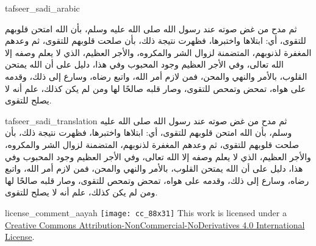 \begin{taggedblock}{tafseer_sadi_arabic}
\begin{Arabic}
ثم مدح من غض صوته عند رسول الله صلى الله عليه وسلم، بأن الله امتحن قلوبهم للتقوى، أي: ابتلاها واختبرها، فظهرت نتيجة ذلك، بأن صلحت قلوبهم للتقوى، ثم وعدهم المغفرة لذنوبهم، المتضمنة لزوال الشر والمكروه، والأجر العظيم، الذي لا يعلم وصفه إلا الله تعالى، وفي الأجر العظيم وجود المحبوب  وفي هذا، دليل على أن الله يمتحن القلوب، بالأمر والنهي والمحن، فمن لازم أمر الله، واتبع رضاه، وسارع إلى ذلك، وقدمه على هواه، تمحض وتمحص للتقوى، وصار قلبه صالحًا لها ومن لم يكن كذلك، علم أنه لا يصلح للتقوى.
\end{Arabic}
\end{taggedblock}
\begin{taggedblock}{tafseer_sadi_translation}
ثم مدح من غض صوته عند رسول الله صلى الله عليه وسلم، بأن الله امتحن قلوبهم للتقوى، أي: ابتلاها واختبرها، فظهرت نتيجة ذلك، بأن صلحت قلوبهم للتقوى، ثم وعدهم المغفرة لذنوبهم، المتضمنة لزوال الشر والمكروه، والأجر العظيم، الذي لا يعلم وصفه إلا الله تعالى، وفي الأجر العظيم وجود المحبوب  وفي هذا، دليل على أن الله يمتحن القلوب، بالأمر والنهي والمحن، فمن لازم أمر الله، واتبع رضاه، وسارع إلى ذلك، وقدمه على هواه، تمحض وتمحص للتقوى، وصار قلبه صالحًا لها ومن لم يكن كذلك، علم أنه لا يصلح للتقوى.
\end{taggedblock}
\begin{taggedblock}{license_comment_aayah}
\texttt{[image: cc\_88x31]}
This work is licensed under a 
\href{http://creativecommons.org/licenses/by-nc-nd/4.0/}{Creative Commons Attribution-NonCommercial-NoDerivatives 4.0 International License}.
\end{taggedblock}
\begin{comment}
Please use the following for footnotes:- Sample\footnoteQ{Text of Qur'an footnote goes here.}.
Sample\footnoteT{Text of Tafseer footnote goes here.}.
\end{comment}